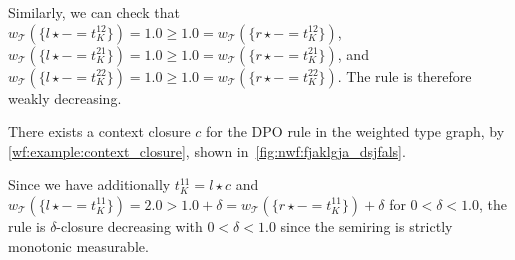 \begin{example}
    Similarly, we can check that $w_\mathcal{T}(\{l \star - = t_K^{12}\}) = 1.0 \geq 1.0 = w_\mathcal{T}(\{r \star - = t_K^{12}\})$,  $w_\mathcal{T}(\{l \star - = t_K^{21}\}) = 1.0 \geq 1.0 = w_\mathcal{T}(\{r \star - = t_K^{21}\})$, and $w_\mathcal{T}(\{l \star - = t_K^{22}\}) = 1.0 \geq 1.0 = w_\mathcal{T}(\{r \star - = t_K^{22}\})$. The rule is therefore weakly decreasing.

    There exists a context closure $c$ for the DPO rule in the weighted type graph, by \autoref{wf:example:context_closure}, shown in~\autoref{fig:nwf:fjaklgja_dsjfals}.
    \begin{figure}[!ht]
        \centering
    \caption{}
    \label{fig:nwf:fjaklgja_dsjfals}
  \end{figure}
    Since we have additionally $t_K^{11} = l \star c$ and $w_\mathcal{T}(\{l \star - = t_K^{11}\}) = 2.0 > 1.0 + \delta = w_\mathcal{T}(\{r \star - = t_K^{11}\}) + \delta$ for $0 < \delta < 1.0$, the rule is $\delta$-closure decreasing with $0 < \delta < 1.0$ since the semiring is strictly monotonic measurable.
\end{example} 

